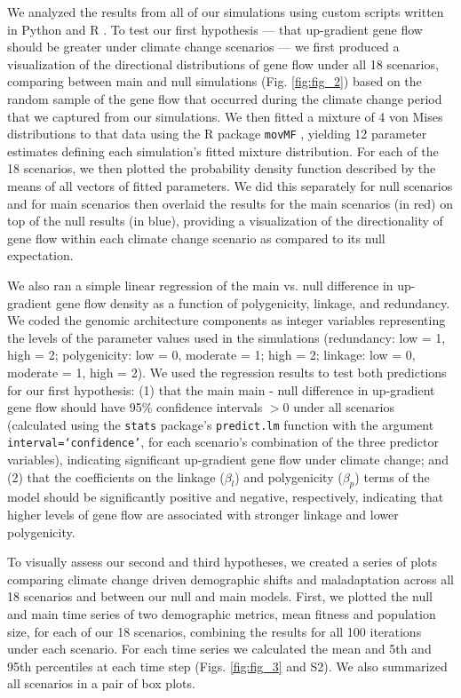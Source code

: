 \documentclass[9pt,twocolumn,twoside,lineno]{pnas-new}
\begin{document}
{We analyzed the results from all of our simulations using custom scripts written in 
Python \cite{rossum} and R \cite{r_core_team}. To test our first hypothesis --- that up-gradient gene flow should be greater under climate change scenarios --- we first produced a visualization of the directional 
distributions of gene flow under all 18 scenarios, comparing between main
and null simulations (Fig. \ref{fig:fig_2}) based on the random 
sample of the gene flow that occurred during the climate change period that we captured from our simulations. We then fitted a mixture of 4 von Mises distributions to that data
using the R package \texttt{movMF} \cite{hornik},
yielding 12 parameter estimates defining each simulation's fitted mixture distribution. For each of 
the 18 scenarios, we then plotted the probability density function 
described by the means of all vectors of fitted parameters. We did this 
separately for null scenarios and for main scenarios then overlaid the results for the main scenarios (in red)
on top of the null results (in blue), providing a visualization of the directionality of gene flow within each 
climate     change scenario as compared to its null expectation.

We also ran a simple linear regression
of the main vs. null difference in up-gradient gene flow density
as a function of polygenicity, linkage, and redundancy. We coded the genomic architecture components
as integer variables
representing the levels of the
parameter values used in the simulations (redundancy: low = 1, high = 2;
polygenicity: low = 0, moderate = 1; high = 2;
linkage: low = 0, moderate = 1, high = 2).
We used the regression results
to test both predictions for our first hypothesis: (1) that the main main - null difference in up-gradient gene flow
should have 95\% confidence intervals $>0$ under all scenarios
(calculated using the \texttt{stats} package's \texttt{predict.lm} function with
the argument \texttt{interval=`confidence'}, for each scenario's combination of the three predictor variables),
indicating significant up-gradient gene flow under climate change; and (2) that the coefficients on the linkage ($\beta_{l}$) and polygenicity ($\beta_{p}$)
terms of the model should be significantly positive and
negative, respectively, indicating that higher levels of gene flow are associated with stronger linkage and lower polygenicity.

To visually assess our second and third hypotheses, we created a series of
plots comparing climate change driven demographic shifts
and maladaptation across all 18 scenarios and between our null and main models.
First, we plotted the 
null and main time series of two demographic
metrics, mean fitness and population size, for 
each of our 18 scenarios, combining the results for all 100 iterations under each scenario. For each time series we calculated the mean and 5th and 95th percentiles at each time step (Figs. \ref{fig:fig_3} and S2).
We also summarized all scenarios in a pair of box plots.

}
\end{document}
